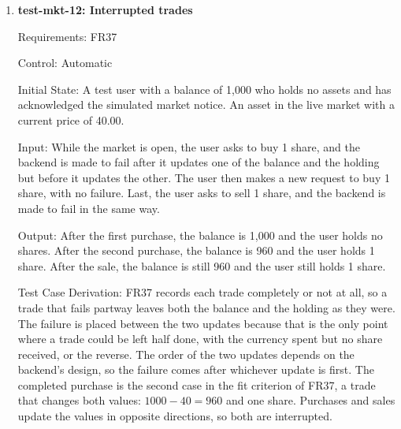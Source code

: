 \documentclass[12pt, titlepage]{article}
\begin{document}
\begin{enumerate}
Test Case Derivation: SRS Section 6.7 accepts a purchase only when
$n \cdot p_a \leq B$ and a sale only when $n \leq h_a$, and FR37 rejects any
trade outside these limits. Each limit is tested at its value and just past
it. Three shares cost $3 \cdot 40 = 120$, which equals user 1's balance and
is more than user 2's by 0.01, the smallest amount a cost can exceed a
balance by. User 1 then holds 3 shares, so a sale of 3 is at the limit and a
sale of 4 is one share over it. This catches a check that uses $<$ instead of
$\leq$. The refused trades are checked for changes to both the balance and the
holding, since FR37 requires that a rejected trade change neither.

How test will be performed: A pytest test sends each trade and reads the
balance and holdings of each user through the API after each one.

\item{\textbf{test-mkt-12: Interrupted trades}\\}

Requirements: FR37

Control: Automatic

Initial State: A test user with a balance of 1,000 who holds no assets and has
acknowledged the simulated market notice. An asset in the live market with a
current price of 40.00.

Input: While the market is open, the user asks to buy 1 share, and the
backend is made to fail after it updates one of the balance and the holding
but before it updates the other. The user then makes a new request to buy 1
share, with no failure. Last, the user asks to sell 1 share, and the backend
is made to fail in the same way.

Output: After the first purchase, the balance is 1,000 and the user holds no
shares. After the second purchase, the balance is 960 and the user holds 1
share. After the sale, the balance is still 960 and the user still holds 1
share.

Test Case Derivation: FR37 records each trade completely or not at all, so a
trade that fails partway leaves both the balance and the holding as they
were. The failure is placed between the two updates because that is the only
point where a trade could be left half done, with the currency spent but no
share received, or the reverse. The order of the two updates depends on the
backend's design, so the failure comes after whichever update is first. The
completed purchase is the second case in the fit criterion of FR37, a trade
that changes both values: $1000 - 40 = 960$ and one share. Purchases and
sales update the values in opposite directions, so both are interrupted.


\end{enumerate}
\end{document}
